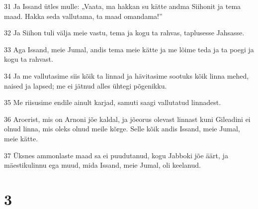 \par 31 Ja Issand ütles mulle: „Vaata, ma hakkan su kätte andma Siihonit ja tema maad. Hakka seda vallutama, ta maad omandama!”
\par 32 Ja Siihon tuli välja meie vastu, tema ja kogu ta rahvas, taplusesse Jahsasse.
\par 33 Aga Issand, meie Jumal, andis tema meie kätte ja me lõime teda ja ta poegi ja kogu ta rahvast.
\par 34 Ja me vallutasime siis kõik ta linnad ja hävitasime sootuks kõik linna mehed, naised ja lapsed; me ei jätnud alles ühtegi põgenikku.
\par 35 Me riisusime endile ainult karjad, samuti saagi vallutatud linnadest.
\par 36 Aroerist, mis on Arnoni jõe kaldal, ja jõeorus olevast linnast kuni Gileadini ei olnud linna, mis oleks olnud meile kõrge. Selle kõik andis Issand, meie Jumal, meie kätte.
\par 37 Üksnes ammonlaste maad sa ei puudutanud, kogu Jabboki jõe äärt, ja mäestikulinnu ega muud, mida Issand, meie Jumal, oli keelanud.

\chapter{3}

